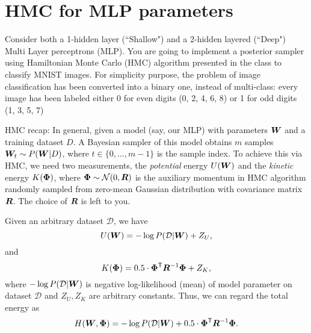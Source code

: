
%
\newpage
\section*{%
    HMC for MLP parameters
}

%
\hfill

%
\noindent
%
Consider both a 1-hidden layer (``Shallow") and a 2-hidden layered (``Deep") Multi Layer perceptrons (MLP). You are going to implement a posterior sampler using Hamiltonian Monte Carlo (HMC) algorithm presented in the class to classify MNIST images. For simplicity purpose, the problem of image classification has been converted into a binary one, instead of multi-class: every image has been labeled either 0 for even digits (0, 2, 4, 6, 8) or 1 for odd digits (1, 3, 5, 7) 

HMC recap: In general, given a model (say, our MLP) with parameters  $\bm{W}$ and a training dataset $D$.
A Bayesian sampler of this model obtains $m$ samples $\bm{W}_{t} \sim P(\bm{W}|D)$, where $t \in \{0,\ldots,m-1\}$ is the sample index.
To achieve this via HMC, we need two measurements, the {\em potential} energy $U(\bm{W})$
and the {\em kinetic} energy $K(\bm{\Phi})$, where $\bm{\Phi} \sim \mathcal{N}(0, \bm{R})$ is the
auxiliary momentum in HMC algorithm randomly sampled from zero-mean Gaussian
distribution with covariance matrix $\bm{R}$.
The choice of $\bm{R}$ is left to you.

Given an arbitrary dataset $\mathcal{D}$, we have $$U(\bm{W}) = -\log
P(\mathcal{D}|\bm{W}) + Z_{U},$$ and $$K(\bm{\Phi}) = 0.5 \cdot \bm{\Phi}^\mathsf{T}
\bm{R}^{-1} \bm{\Phi} + Z_{K},$$ where $-\log P(\mathcal{D}|\bm{W})$ is negative
log-likelihood (mean) of model parameter on dataset $\mathcal{D}$ and $Z_{U},
Z_{K}$ are arbitrary constants.
Thus, we can regard the total energy as $$H(\bm{W}, \bm{\Phi}) = -\log
P(\mathcal{D}|\bm{W}) + 0.5 \cdot \bm{\Phi}^\mathsf{T} \bm{R}^{-1} \bm{\Phi}.$$

